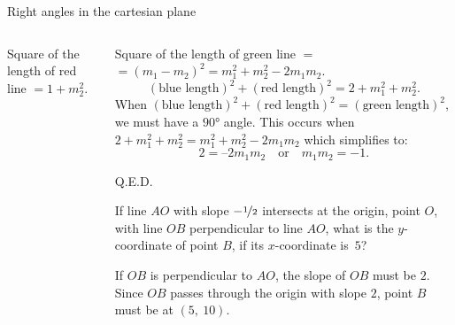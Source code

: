 \documentclass[9pt,aspectratio=169]{beamer}
\begin{document}
\begin{frame}{Right angles in the cartesian plane}
\begin{columns}[T]
\begin{column}{0.5\textwidth}
      Square of the length of red line $= 1 + m_2^2$.
    \end{column}
    \begin{column}{0.5\textwidth}
      Square of the length of green line $=$ $= (m_1-m_2)^2 = m_1^2 + m_2^2 - 2 m_1 m_2$.
      \[ (\text{blue length})^2 + (\text{red length})^2 = 2 + m_1^2 + m_2^2. \]
      When $(\text{blue length})^2 + (\text{red length})^2 = (\text{green length})^2$, we must have a $90°$ angle.  This occurs when $2 + m_1^2 + m_2^2 = m_1^2 + m_2^2 - 2 m_1 m_2$ which simplifies to:
      \[ 2 = – 2 m_1 m_2 \quad \text{or}\quad m_1 m_2 = -1.\]\vspace*{-1.3\baselineskip}
      \begin{flushright}Q.E.D.\end{flushright}
      \begin{problem}
        If line $AO$ with slope $-\nicefrac{1}{2}$ intersects at the origin, point $O$, with line $OB$ perpendicular to line $AO$, what is the $y$-coordinate of point $B$, if its $x$-coordinate is~$5$?
      \end{problem}
      If $OB$ is perpendicular to $AO$, the slope of $OB$ must be $2$.  Since $OB$ passes through the origin with slope $2$, point $B$ must be at $(5,\ 10)$.
    \end{column}
  \end{columns}
\end{frame}
\end{document}
